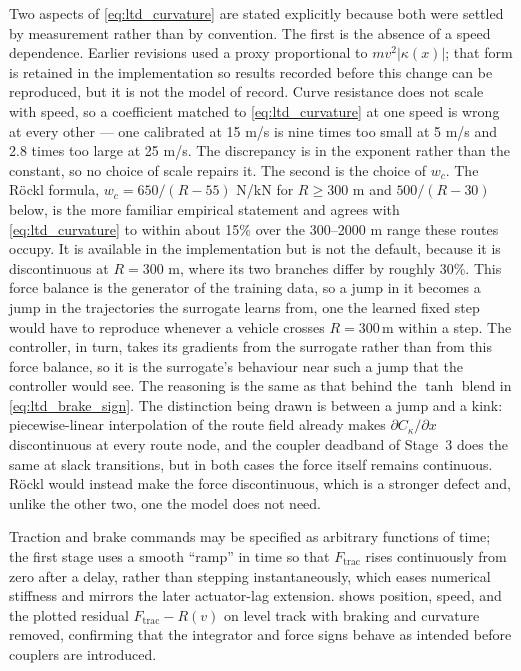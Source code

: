 Two aspects of \cref{eq:ltd_curvature} are stated explicitly because both were settled by measurement rather than by convention. The first is the absence of a speed dependence. Earlier revisions used a proxy proportional to $m v^{2}|\kappa(x)|$; that form is retained in the implementation so results recorded before this change can be reproduced, but it is not the model of record. Curve resistance does not scale with speed, so a coefficient matched to \cref{eq:ltd_curvature} at one speed is wrong at every other --- one calibrated at 15 m/s is nine times too small at 5 m/s and 2.8 times too large at 25 m/s. The discrepancy is in the exponent rather than the constant, so no choice of scale repairs it. The second is the choice of $w_c$. The R\"ockl formula, $w_c = 650/(R-55)$ N/kN for $R \geq 300$ m and $500/(R-30)$ below, is the more familiar empirical statement and agrees with \cref{eq:ltd_curvature} to within about 15\% over the 300--2000 m range these routes occupy. It is available in the implementation but is not the default, because it is discontinuous at $R = 300$ m, where its two branches differ by roughly 30\%. This force balance is the generator of the training data, so a jump in it becomes a jump in the trajectories the surrogate learns from, one the learned fixed step would have to reproduce whenever a vehicle crosses $R = 300$\,m within a step. The controller, in turn, takes its gradients from the surrogate rather than from this force balance, so it is the surrogate's behaviour near such a jump that the controller would see. The reasoning is the same as that behind the $\tanh$ blend in \cref{eq:ltd_brake_sign}. The distinction being drawn is between a jump and a kink: piecewise-linear interpolation of the route field already makes $\partial C_{\kappa}/\partial x$ discontinuous at every route node, and the coupler deadband of Stage~3 does the same at slack transitions, but in both cases the force itself remains continuous. R\"ockl would instead make the force discontinuous, which is a stronger defect and, unlike the other two, one the model does not need.

Traction and brake commands may be specified as arbitrary functions of time; the first stage uses a smooth ``ramp'' in time so that $F_{\mathrm{trac}}$ rises continuously from zero after a delay, rather than stepping instantaneously, which eases numerical stiffness and mirrors the later actuator-lag extension.  shows position, speed, and the plotted residual $F_{\mathrm{trac}}-R(v)$ on level track with braking and curvature removed, confirming that the integrator and force signs behave as intended before couplers are introduced.

